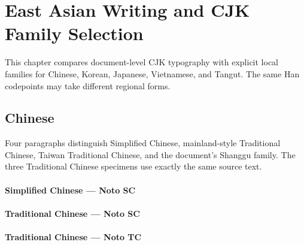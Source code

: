 \documentclass[11pt,twoside]{impeart}
\begin{document}


\section{East Asian Writing and CJK Family Selection}

This chapter compares document-level CJK typography with explicit local
families for Chinese, Korean, Japanese, Vietnamese, and Tangut.
The same Han codepoints may take different regional forms.

\subsection{Chinese}

Four paragraphs distinguish Simplified Chinese, mainland-style Traditional
Chinese, Taiwan Traditional Chinese, and the document's Shanggu family.
The three Traditional Chinese specimens use exactly the same source text.

\paragraph{Simplified Chinese --- Noto SC}

\paragraph{Traditional Chinese --- Noto SC}

\paragraph{Traditional Chinese --- Noto TC}
\end{document}
